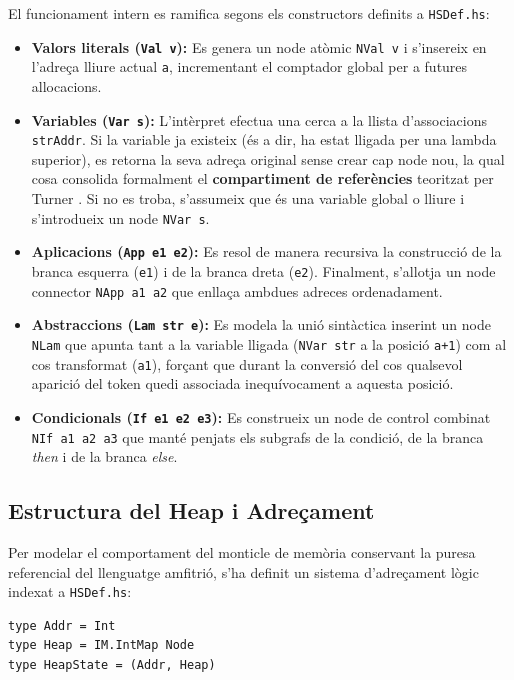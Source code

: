 El funcionament intern es ramifica segons els constructors definits a \texttt{HSDef.hs}:
\begin{itemize}
    \item \textbf{Valors literals (\texttt{Val v}):} Es genera un node atòmic \texttt{NVal v} i s'insereix en l'adreça lliure actual \texttt{a}, incrementant el comptador global per a futures allocacions.
    \item \textbf{Variables (\texttt{Var s}):} L'intèrpret efectua una cerca a la llista d'associacions \texttt{strAddr}. Si la variable ja existeix (és a dir, ha estat lligada per una lambda superior), es retorna la seva adreça original sense crear cap node nou, la qual cosa consolida formalment el \textbf{compartiment de referències} teoritzat per Turner \cite{turner1979new}. Si no es troba, s'assumeix que és una variable global o lliure i s'introdueix un node \texttt{NVar s}.
    \item \textbf{Aplicacions (\texttt{App e1 e2}):} Es resol de manera recursiva la construcció de la branca esquerra (\texttt{e1}) i de la branca dreta (\texttt{e2}). Finalment, s'allotja un node connector \texttt{NApp a1 a2} que enllaça ambdues adreces ordenadament.
    \item \textbf{Abstraccions (\texttt{Lam str e}):} Es modela la unió sintàctica inserint un node \texttt{NLam} que apunta tant a la variable lligada (\texttt{NVar str} a la posició \texttt{a+1}) com al cos transformat (\texttt{a1}), forçant que durant la conversió del cos qualsevol aparició del token quedi associada inequívocament a aquesta posició.
    \item \textbf{Condicionals (\texttt{If e1 e2 e3}):} Es construeix un node de control combinat \texttt{NIf a1 a2 a3} que manté penjats els subgrafs de la condició, de la branca \textit{then} i de la branca \textit{else}.
\end{itemize}

\subsection{Estructura del Heap i Adreçament}

Per modelar el comportament del monticle de memòria conservant la puresa referencial del llenguatge amfitrió, s'ha definit un sistema d'adreçament lògic indexat a \texttt{HSDef.hs}:

\begin{lstlisting}[style=haskellstyle, caption=Definicions de l'estructura del monticle a HSDef.hs]
type Addr = Int
type Heap = IM.IntMap Node
type HeapState = (Addr, Heap)
\end{lstlisting}

